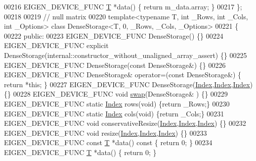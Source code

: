\begin{DoxyCode}
00216     EIGEN\_DEVICE\_FUNC \hyperlink{group___sparse_core___module_class_eigen_1_1_triplet}{T} *data() \{ \textcolor{keywordflow}{return} m\_data.array; \}
00217 \};
00218 
00219 \textcolor{comment}{// null matrix}
00220 \textcolor{keyword}{template}<\textcolor{keyword}{typename} T, \textcolor{keywordtype}{int} \_Rows, \textcolor{keywordtype}{int} \_Cols, \textcolor{keywordtype}{int} \_Options> \textcolor{keyword}{class }DenseStorage<T, 0, \_Rows, \_Cols, \_Options>
00221 \{
00222   \textcolor{keyword}{public}:
00223     EIGEN\_DEVICE\_FUNC DenseStorage() \{\}
00224     EIGEN\_DEVICE\_FUNC \textcolor{keyword}{explicit} DenseStorage(internal::constructor\_without\_unaligned\_array\_assert) \{\}
00225     EIGEN\_DEVICE\_FUNC DenseStorage(\textcolor{keyword}{const} DenseStorage&) \{\}
00226     EIGEN\_DEVICE\_FUNC DenseStorage& operator=(\textcolor{keyword}{const} DenseStorage&) \{ \textcolor{keywordflow}{return} *\textcolor{keyword}{this}; \}
00227     EIGEN\_DEVICE\_FUNC DenseStorage(\hyperlink{namespace_eigen_a62e77e0933482dafde8fe197d9a2cfde}{Index},\hyperlink{namespace_eigen_a62e77e0933482dafde8fe197d9a2cfde}{Index},\hyperlink{namespace_eigen_a62e77e0933482dafde8fe197d9a2cfde}{Index}) \{\}
00228     EIGEN\_DEVICE\_FUNC \textcolor{keywordtype}{void} \hyperlink{endian_8c_a3ca5ecd34b04d6a243c054ac3a57f68d}{swap}(DenseStorage& ) \{\}
00229     EIGEN\_DEVICE\_FUNC \textcolor{keyword}{static} \hyperlink{namespace_eigen_a62e77e0933482dafde8fe197d9a2cfde}{Index} rows(\textcolor{keywordtype}{void}) \{\textcolor{keywordflow}{return} \_Rows;\}
00230     EIGEN\_DEVICE\_FUNC \textcolor{keyword}{static} \hyperlink{namespace_eigen_a62e77e0933482dafde8fe197d9a2cfde}{Index} cols(\textcolor{keywordtype}{void}) \{\textcolor{keywordflow}{return} \_Cols;\}
00231     EIGEN\_DEVICE\_FUNC \textcolor{keywordtype}{void} conservativeResize(\hyperlink{namespace_eigen_a62e77e0933482dafde8fe197d9a2cfde}{Index},\hyperlink{namespace_eigen_a62e77e0933482dafde8fe197d9a2cfde}{Index},\hyperlink{namespace_eigen_a62e77e0933482dafde8fe197d9a2cfde}{Index}) \{\}
00232     EIGEN\_DEVICE\_FUNC \textcolor{keywordtype}{void} resize(\hyperlink{namespace_eigen_a62e77e0933482dafde8fe197d9a2cfde}{Index},\hyperlink{namespace_eigen_a62e77e0933482dafde8fe197d9a2cfde}{Index},\hyperlink{namespace_eigen_a62e77e0933482dafde8fe197d9a2cfde}{Index}) \{\}
00233     EIGEN\_DEVICE\_FUNC \textcolor{keyword}{const} \hyperlink{group___sparse_core___module_class_eigen_1_1_triplet}{T} *data()\textcolor{keyword}{ const }\{ \textcolor{keywordflow}{return} 0; \}
00234     EIGEN\_DEVICE\_FUNC \hyperlink{group___sparse_core___module_class_eigen_1_1_triplet}{T} *data() \{ \textcolor{keywordflow}{return} 0; \}

\end{DoxyCode}
